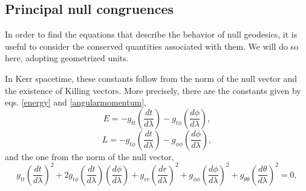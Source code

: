 \documentclass[
12pt,		%
openright,	%
twoside,  %
a4paper,			%
chapter=TITLE,		%
english,			%
french,				%
spanish,			%
brazil				%
]{USPSC-classe/USPSC}
\begin{document}
\begin{apendicesenv}
\section{Principal null congruences}\label{congrukerr}
In order to find the equations that describe the behavior of null geodesics, it is useful to consider the conserved quantities associated with them. We will do so here, adopting geometrized units.

In Kerr spacetime, these constants follow from the norm of the null vector and the existence of Killing vectors. More precisely, there are the constants given by eqs. \ref{energy} and \ref{angularmomentum},
\begin{equation}
    E=-g_{tt}\left(\frac{dt}{d\lambda}\right)-g_{t\phi}\left(\frac{d\phi}{d\lambda}\right),
\end{equation}
\begin{equation}
    L=-g_{t\phi}\left(\frac{dt}{d\lambda}\right)-g_{\phi\phi}\left(\frac{d\phi}{d\lambda}\right),
\end{equation}
and the one from the norm of the null vector,
\begin{equation}
    g_{tt}\left(\frac{dt}{d\lambda}\right)^2+2g_{t\phi}\left(\frac{dt}{d\lambda}\right)\left(\frac{d\phi}{d\lambda}\right)+g_{rr}\left(\frac{dr}{d\lambda}\right)^2+g_{\phi\phi}\left(\frac{d\phi}{d\lambda}\right)^2+g_{\theta\theta}\left(\frac{d\theta}{d\lambda}\right)^2=0,
\end{equation}


\end{apendicesenv}
\end{document}
